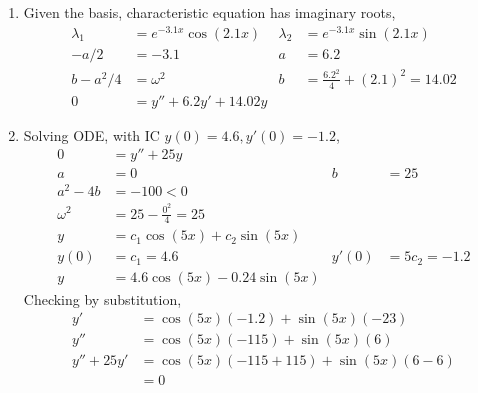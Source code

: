 \begin{enumerate}
    \item Given the basis, characteristic equation has imaginary roots,
          \begin{align}
              \lambda_{1} & = e^{-3.1x}\cos(2.1 x) & \lambda_{2} & = e^{-3.1x}\sin(2.1 x)                    \\
              -a/2        & = -3.1                 & a           & = 6.2                                     \\
              b - a^{2}/4 & = \omega ^{2}          & b           & =   \frac{6.2^{2}}{4} + (2.1)^{2} = 14.02 \\
              0           & = y'' + 6.2y' + 14.02y
          \end{align}

    \item Solving ODE, with IC $ y(0) = 4.6, y'(0) = -1.2 $,
          \begin{align}
              0          & = y'' + 25y                                               \\
              a          & = 0                             & b     & = 25            \\
              a^{2} - 4b & = -100  < 0                                               \\
              \omega^{2} & = 25 - \frac{0^{2}}{4} = 25                               \\
              y          & = c_{1}\cos(5x) + c_{2}\sin(5x)                           \\
              y(0)       & = c_{1} = 4.6                   & y'(0) & = 5c_{2} = -1.2 \\
              y          & = 4.6 \cos(5x) - 0.24 \sin(5x)
          \end{align}
          Checking by substitution,
          \begin{align}
              y'         & = \cos(5 x) (- 1.2) + \sin(5 x)(-23)       \\
              y''        & = \cos(5 x)(-115) + \sin(5 x)(6)           \\
              y'' + 25y' & = \cos(5 x)(-115 + 115) + \sin(5 x)(6 - 6) \\
                         & = 0
          \end{align}


\end{enumerate}
